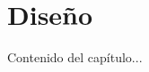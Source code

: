 \documentclass[../main.tex]{subfiles}
\begin{document}
\chapter{Diseño}
\label{C:disenno}

Contenido del capítulo...
\end{document}

